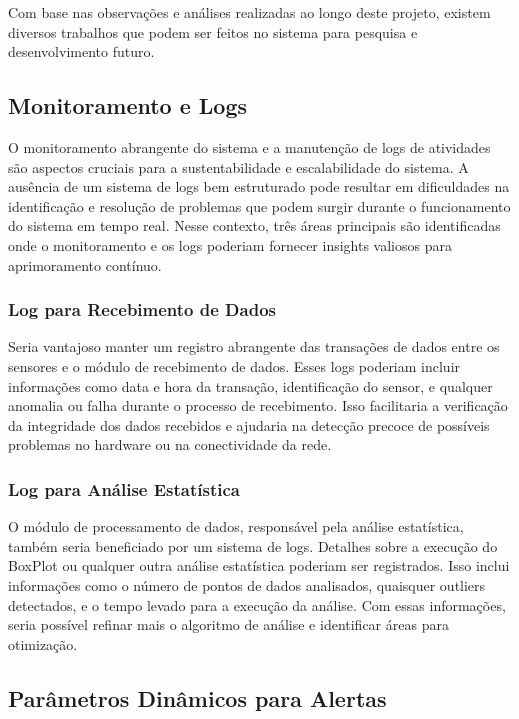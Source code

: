 Com base nas observações e análises realizadas ao longo deste projeto, existem diversos trabalhos que podem ser feitos no sistema para pesquisa e desenvolvimento futuro.


\subsection{Monitoramento e Logs}

O monitoramento abrangente do sistema e a manutenção de logs de atividades são aspectos cruciais para a sustentabilidade e escalabilidade do sistema. A ausência de um sistema de logs bem estruturado pode resultar em dificuldades na identificação e resolução de problemas que podem surgir durante o funcionamento do sistema em tempo real. Nesse contexto, três áreas principais são identificadas onde o monitoramento e os logs poderiam fornecer insights valiosos para aprimoramento contínuo.

\subsubsection{Log para Recebimento de Dados}

Seria vantajoso manter um registro abrangente das transações de dados entre os sensores e o módulo de recebimento de dados. Esses logs poderiam incluir informações como data e hora da transação, identificação do sensor, e qualquer anomalia ou falha durante o processo de recebimento. Isso facilitaria a verificação da integridade dos dados recebidos e ajudaria na detecção precoce de possíveis problemas no hardware ou na conectividade da rede.

\subsubsection{Log para Análise Estatística}

O módulo de processamento de dados, responsável pela análise estatística, também seria beneficiado por um sistema de logs. Detalhes sobre a execução do BoxPlot ou qualquer outra análise estatística poderiam ser registrados. Isso inclui informações como o número de pontos de dados analisados, quaisquer outliers detectados, e o tempo levado para a execução da análise. Com essas informações, seria possível refinar mais o algoritmo de análise e identificar áreas para otimização.


\subsection{Parâmetros Dinâmicos para Alertas}

